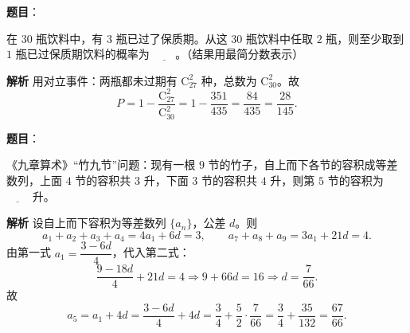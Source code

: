 \begin{answer}

\textbf{题目}：

在 $30$ 瓶饮料中，有 $3$ 瓶已过了保质期。从这 $30$ 瓶饮料中任取 $2$ 瓶，则至少取到 $1$ 瓶已过保质期饮料的概率为 $\underline{\qquad}$。（结果用最简分数表示）

\textbf{解析}
用对立事件：两瓶都未过期有 $\mathrm C_{27}^2$ 种，总数为 $\mathrm C_{30}^2$。故
\nopagebreak[4]
\[P=1-\frac{\mathrm C_{27}^2}{\mathrm C_{30}^2}=1-\frac{351}{435}=\frac{84}{435}=\frac{28}{145}.\]


\end{answer}
\begin{answer}

\textbf{题目}：

《九章算术》“竹九节”问题：现有一根 $9$ 节的竹子，自上而下各节的容积成等差数列，上面 $4$ 节的容积共 $3$ 升，下面 $3$ 节的容积共 $4$ 升，则第 $5$ 节的容积为 $\underline{\qquad}$ 升。

\textbf{解析}
设自上而下容积为等差数列 $\{a_n\}$，公差 $d$。则
\nopagebreak[4]
\[a_1+a_2+a_3+a_4=4a_1+6d=3,\qquad a_7+a_8+a_9=3a_1+21d=4.\]
由第一式 $a_1=\dfrac{3-6d}4$，代入第二式：
\nopagebreak[4]
\[\frac{9-18d}4+21d=4\Longrightarrow9+66d=16\Longrightarrow d=\frac7{66}.\]
故
\nopagebreak[4]
\[a_5=a_1+4d=\frac{3-6d}4+4d=\frac34+\frac52\cdot\frac7{66}=\frac34+\frac{35}{132}=\frac{67}{66}.\]


\end{answer}
